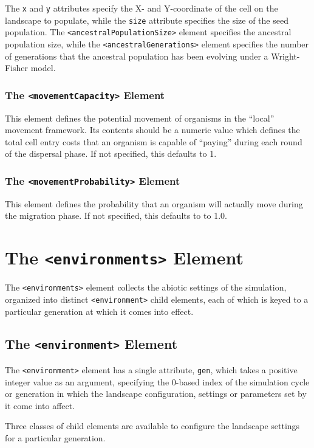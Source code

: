 \documentclass[11pt]{article}
\newcommand{\xmlelem}[1]{{\tt<\textcolor{xmlelem}{#1}>}}
\newcommand{\xmlattr}[1]{{\tt\textcolor{xmlattr}{#1}}}
\begin{document}
The \xmlattr{x} and \xmlattr{y} attributes specify the X- and Y-coordinate of the cell on the landscape to populate, while the \xmlattr{size} attribute specifies the size of the seed population.
The \xmlelem{ancestralPopulationSize} element specifies the ancestral population size, while the \xmlelem{ancestralGenerations} element specifies the number of generations that the ancestral population has been evolving under a Wright-Fisher model.

\subsubsection{The \xmlelem{movementCapacity} Element}
This element defines the potential movement of organisms in the ``local'' movement framework. Its contents should be a numeric value which defines the total cell entry costs that an organism is capable of ``paying'' during each round of the dispersal phase. If not specified, this defaults to 1.

\subsubsection{The \xmlelem{movementProbability} Element}
This element defines the probability that an organism will actually move during the migration phase. If not specified, this defaults to to 1.0.


\section{The \xmlelem{environments} Element}

The \xmlelem{environments} element collects the abiotic settings of the simulation, organized into distinct \xmlelem{environment} child elements, each of which is keyed to a particular generation at which it comes into effect.

\subsection{The \xmlelem{environment} Element}
The \xmlelem{environment} element has a single attribute, \xmlattr{gen}, which takes a positive integer value as an argument, specifying the 0-based index of the simulation cycle or generation in which the landscape configuration, settings or parameters set by it come into affect.

Three classes of child elements are available to configure the landscape settings for a particular generation.
\end{document}
